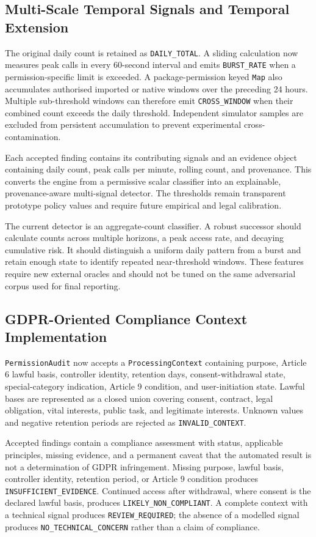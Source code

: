 \subsection{Multi-Scale Temporal Signals and Temporal Extension}

The original daily count is retained as \texttt{DAILY\_TOTAL}. A sliding calculation now measures peak calls in every 60-second interval and emits \texttt{BURST\_RATE} when a permission-specific limit is exceeded. A package-permission keyed \texttt{Map} also accumulates authorised imported or native windows over the preceding 24 hours. Multiple sub-threshold windows can therefore emit \texttt{CROSS\_WINDOW} when their combined count exceeds the daily threshold. Independent simulator samples are excluded from persistent accumulation to prevent experimental cross-contamination.

Each accepted finding contains its contributing signals and an evidence object containing daily count, peak calls per minute, rolling count, and provenance. This converts the engine from a permissive scalar classifier into an explainable, provenance-aware multi-signal detector. The thresholds remain transparent prototype policy values and require future empirical and legal calibration.

The current detector is an aggregate-count classifier. A robust successor should calculate counts across multiple horizons, a peak access rate, and decaying cumulative risk. It should distinguish a uniform daily pattern from a burst and retain enough state to identify repeated near-threshold windows. These features require new external oracles and should not be tuned on the same adversarial corpus used for final reporting.

\subsection{GDPR-Oriented Compliance Context Implementation}

\texttt{PermissionAudit} now accepts a \texttt{ProcessingContext} containing purpose, Article 6 lawful basis, controller identity, retention days, consent-withdrawal state, special-category indication, Article 9 condition, and user-initiation state. Lawful bases are represented as a closed union covering consent, contract, legal obligation, vital interests, public task, and legitimate interests. Unknown values and negative retention periods are rejected as \texttt{INVALID\_CONTEXT}.

Accepted findings contain a compliance assessment with status, applicable principles, missing evidence, and a permanent caveat that the automated result is not a determination of GDPR infringement. Missing purpose, lawful basis, controller identity, retention period, or Article 9 condition produces \texttt{INSUFFICIENT\_EVIDENCE}. Continued access after withdrawal, where consent is the declared lawful basis, produces \texttt{LIKELY\_NON\_COMPLIANT}. A complete context with a technical signal produces \texttt{REVIEW\_REQUIRED}; the absence of a modelled signal produces \texttt{NO\_TECHNICAL\_CONCERN} rather than a claim of compliance.

